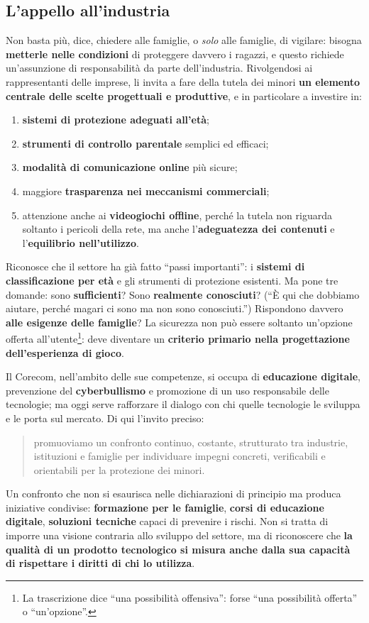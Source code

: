 \subsection{L'appello all'industria}

Non basta più, dice, chiedere alle famiglie, o \emph{solo} alle famiglie, di
vigilare: bisogna \textbf{metterle nelle condizioni} di proteggere davvero i
ragazzi, e questo richiede un'assunzione di responsabilità da parte
dell'industria. Rivolgendosi ai rappresentanti delle imprese, li invita a fare
della tutela dei minori \textbf{un elemento centrale delle scelte progettuali e
produttive}, e in particolare a investire in:
\begin{enumerate}
  \item \textbf{sistemi di protezione adeguati all'età};
  \item \textbf{strumenti di controllo parentale} semplici ed efficaci;
  \item \textbf{modalità di comunicazione online} più sicure;
  \item maggiore \textbf{trasparenza nei meccanismi commerciali};
  \item attenzione anche ai \textbf{videogiochi offline}, perché la tutela non
        riguarda soltanto i pericoli della rete, ma anche l'\textbf{adeguatezza
        dei contenuti} e l'\textbf{equilibrio nell'utilizzo}.
\end{enumerate}

Riconosce che il settore ha già fatto ``passi importanti'': i \textbf{sistemi di
classificazione per età} e gli strumenti di protezione esistenti. Ma pone tre
domande: sono \textbf{sufficienti}? Sono \textbf{realmente conosciuti}? (``È qui
che dobbiamo aiutare, perché magari ci sono ma non sono conosciuti.'')
Rispondono davvero \textbf{alle esigenze delle famiglie}? La sicurezza non può
essere soltanto un'opzione offerta all'utente\footnote{La trascrizione dice
``una possibilità offensiva'': forse ``una possibilità offerta'' o
``un'opzione''.}: deve diventare un \textbf{criterio primario nella progettazione
dell'esperienza di gioco}.

Il Corecom, nell'ambito delle sue competenze, si occupa di \textbf{educazione
digitale}, prevenzione del \textbf{cyberbullismo} e promozione di un uso
responsabile delle tecnologie; ma oggi serve rafforzare il dialogo con chi
quelle tecnologie le sviluppa e le porta sul mercato. Di qui l'invito preciso:
\begin{quote}
  promuoviamo un confronto continuo, costante, strutturato tra industrie,
  istituzioni e famiglie per individuare impegni concreti, verificabili e
  orientabili per la protezione dei minori.
\end{quote}
Un confronto che non si esaurisca nelle dichiarazioni di principio ma produca
iniziative condivise: \textbf{formazione per le famiglie}, \textbf{corsi di
educazione digitale}, \textbf{soluzioni tecniche} capaci di prevenire i rischi.
Non si tratta di imporre una visione contraria allo sviluppo del settore, ma di
riconoscere che \textbf{la qualità di un prodotto tecnologico si misura anche
dalla sua capacità di rispettare i diritti di chi lo utilizza}.

